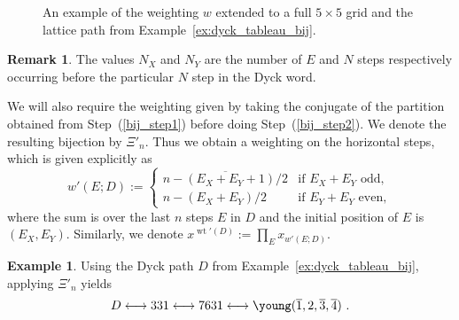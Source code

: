 \documentclass[11pt, leqno]{amsart}
\theoremstyle{plain}
\theoremstyle{definition}
\newtheorem{example}[theorem]{Example}
\newtheorem{remark}[theorem]{Remark}
\numberwithin{equation}{section}
\newcommand{\seteq}{\mathbin{:=}}
\newcommand{\wt}{\operatorname{wt}} %
\newcommand{\ofour}{\overline{4}}
\newcommand{\othree}{\overline{3}}
\newcommand{\otwo}{\overline{2}}
\newcommand{\one}{\overline{1}}
\newcommand{\defn}[1]{{\color{darkred}\emph{#1}}} %
\begin{document}
\begin{figure}
\caption{An example of the weighting $w$ extended to a full $5 \times 5$ grid and the lattice path from Example~\ref{ex:dyck_tableau_bij}.}
\label{fig:Dyck_statistic}
\end{figure}

\begin{remark}
\label{rem:counting_NE}
The values $N_X$ and $N_Y$ are the number of $E$ and $N$ steps respectively occurring before the particular $N$ step in the Dyck word.
\end{remark}

We will also require the weighting given by taking the conjugate of the partition obtained from Step~(\ref{bij_step1}) before doing Step~(\ref{bij_step2}). We denote the resulting bijection by $\Xi'_n$. Thus we obtain a weighting on the horizontal steps, which is given explicitly as
\[
w'(E;D) \seteq \begin{cases}
\overline{n - (E_X + E_Y + 1) / 2} & \text{if $E_X + E_Y$ odd}, \\
n - (E_X + E_Y) / 2 & \text{if $E_Y + E_Y$ even},
\end{cases}
\]
where the sum is over the last $n$ steps $E$ in $D$ and the initial position of $E$ is $(E_X, E_Y)$.
Similarly, we denote $x^{\wt'(D)} \seteq \prod_E x_{w'(E;D)}$.

\begin{example}
\label{ex:dyck_tableau_bij_transpose}
Using the Dyck path $D$ from Example~\ref{ex:dyck_tableau_bij}, applying $\Xi'_n$ yields
\[
D
\longleftrightarrow
331
\longleftrightarrow
7631
\longleftrightarrow
\young(\one,2,\othree,\ofour)\ .
\]
\end{example}
\end{document}
